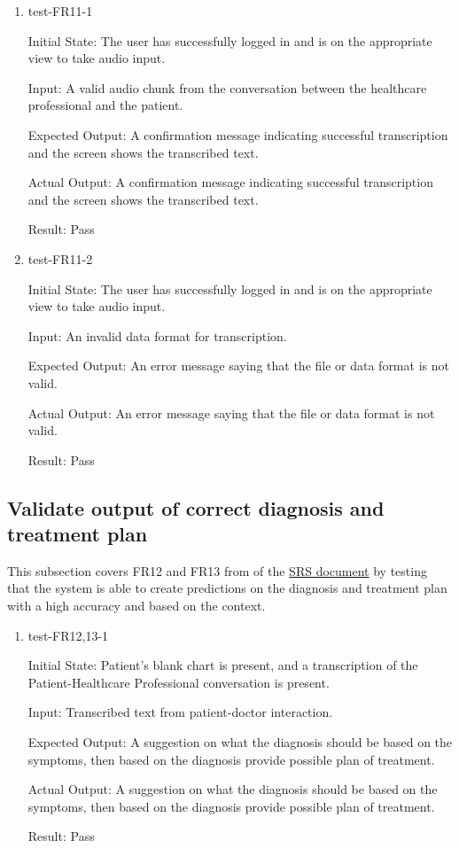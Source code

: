 \documentclass[12pt, titlepage]{article}
\begin{document}
\begin{enumerate}

  \item{test-FR11-1} \label{test-FR11-1}
  
  Initial State: The user has successfully logged in and is on the appropriate view to take audio input. 

  Input: A valid audio chunk from the conversation between the healthcare professional and the patient.

  Expected Output: A confirmation message indicating successful transcription and the screen shows the transcribed text.

  Actual Output: A confirmation message indicating successful transcription and the screen shows the transcribed text.

  Result: Pass


  \item{test-FR11-2} \label{test-FR11-2}

  Initial State: The user has successfully logged in and is on the appropriate view to take audio input.

  Input: An invalid data format for transcription.

  Expected Output: An error message saying that the file or data format is not valid.

  Actual Output: An error message saying that the file or data format is not valid.

  Result: Pass

\end{enumerate}

\subsection{Validate output of correct diagnosis and treatment plan} \label{section:3.6}

This subsection covers FR12 and FR13 from of the \href{https://github.com/Inreet-Kaur/capstone/blob/main/docs/SRS/SRS.pdf} {SRS document} by testing that the system is able to create predictions on the diagnosis and treatment plan with a high accuracy and based on the context.

\begin{enumerate}

  \item{test-FR12,13-1} \label{test-FR12,13-1}
  
  Initial State: Patient's blank chart is present, and a transcription of the Patient-Healthcare Professional conversation is present.

  Input: Transcribed text from patient-doctor interaction.

  Expected Output: A suggestion on what the diagnosis should be based on the symptoms, then based on the diagnosis provide possible plan of treatment.

  Actual Output: A suggestion on what the diagnosis should be based on the symptoms, then based on the diagnosis provide possible plan of treatment.

  Result: Pass

\end{enumerate}
\end{document}
